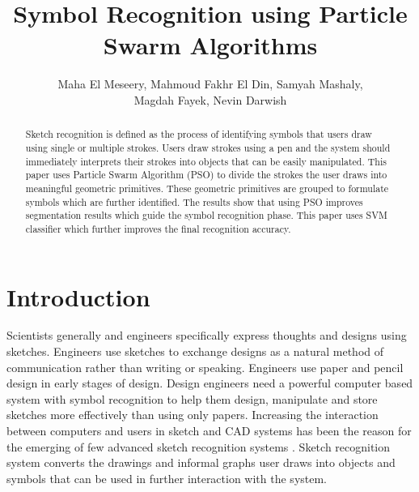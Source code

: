 \documentclass[a4paper,10pt]{IEEEconf}
\title{Symbol Recognition using Particle Swarm Algorithms}
\author{Maha El Meseery,  Mahmoud Fakhr El Din,  Samyah Mashaly,
\\  Magdah Fayek,  Nevin Darwish}
\begin{document}
\maketitle
\begin{abstract}
Sketch recognition is defined as the process of identifying symbols that users draw using single or multiple strokes. Users draw strokes using a pen and the system should immediately interprets their strokes into objects that can be easily manipulated. This paper uses Particle Swarm Algorithm (PSO) to divide the strokes the user draws into meaningful geometric primitives. These geometric primitives are grouped to formulate symbols which are further identified. The results show that using PSO improves segmentation results which guide the symbol recognition phase. This paper uses SVM classifier which further improves the final recognition accuracy.  %
\end{abstract}
\section{Introduction}
Scientists generally and engineers specifically express thoughts and designs using sketches. Engineers use sketches to exchange designs as a natural method of communication rather than writing or speaking. Engineers use paper and pencil design in early stages of design. Design engineers need a powerful computer based system with symbol recognition to help them design, manipulate and store sketches more effectively than using only papers. Increasing the interaction between computers and users in sketch and CAD systems has been the reason for the emerging of few advanced sketch recognition systems \cite{CAD}. Sketch recognition system converts the drawings and informal graphs user draws into objects and symbols that can be used in further interaction with the system. 
\end{document}
